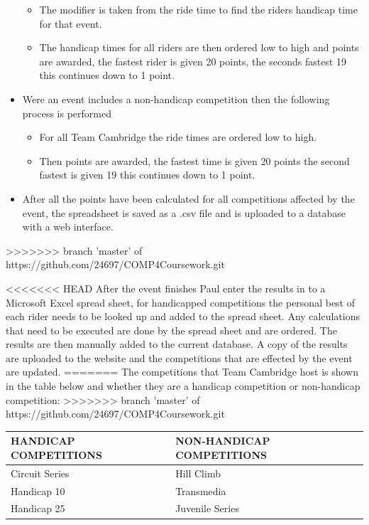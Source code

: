 \begin{itemize}
\begin{itemize}
	\item The modifier is taken from the ride time to find the riders handicap time for that event.
	
	\item The handicap times for all riders are then ordered low to high and points are awarded, the fastest rider is given 20 points, the seconds fastest 19 this continues down to 1 point.
	\end{itemize}
	
	\item Were an event includes a non-handicap competition then the following process is performed
	
	\begin{itemize}
	\item For all Team Cambridge the ride times are ordered low to high.
	
	\item Then points are awarded, the fastest time is given 20 points the second fastest is given 19 this continues down to 1 point.
	\end{itemize}
	
	\item After all the points have been calculated for all competitions affected by the event, the spreadsheet is saved as a .csv file and is uploaded to a database with a web interface.
\end{itemize}
>>>>>>> branch 'master' of https://github.com/24697/COMP4Coursework.git

<<<<<<< HEAD
After the event finishes Paul enter the results in to a Microsoft Excel spread sheet, for handicapped competitions the personal best of each rider needs to be looked up and added to the spread sheet. Any calculations that need to be executed are done by the spread sheet and are ordered. The results are then manually added to the current database. A copy of the results are uploaded to the website and the competitions that are effected by the event are updated.
=======
The competitions that Team Cambridge host is shown in the table below and whether they are a handicap competition or non-handicap competition:
>>>>>>> branch 'master' of https://github.com/24697/COMP4Coursework.git

\begin{tabular}{|l | l|}
	\hline
	HANDICAP COMPETITIONS & NON-HANDICAP COMPETITIONS \\ \hline
	Circuit Series        & Hill Climb \\ \hline 
	Handicap 10           & Transmedia \\ \hline
	Handicap 25           & Juvenile Series \\ \hline
\end{tabular}

